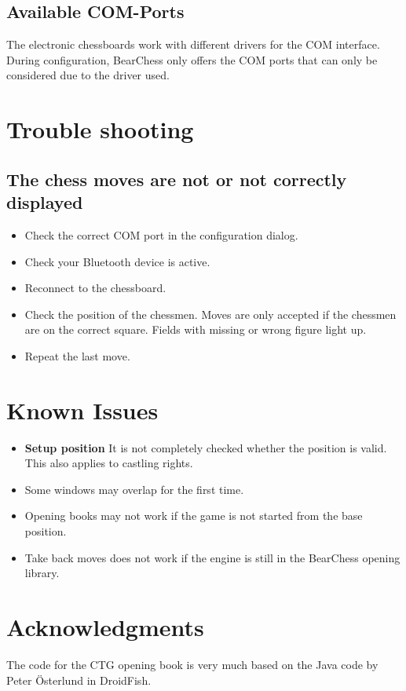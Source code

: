 \documentclass[11pt,a4paper]{article}
\begin{document}
\subsection{Available COM-Ports}
The electronic chessboards work with different drivers for the COM interface. During configuration, BearChess only offers the COM ports that can only be considered due to the driver used.

\section{Trouble shooting}

\subsection{The chess moves are not or not correctly displayed}
\begin{itemize}
	\item Check the correct COM port in the configuration dialog.
	\item Check your Bluetooth device is active.	
	\item Reconnect to the chessboard.	
	\item Check the position of the chessmen. Moves are only accepted if the chessmen are on the correct square. Fields with missing or wrong figure light up.
	\item Repeat the last move.
\end{itemize}


\section{Known Issues}
\begin{itemize}
    \item \textbf{Setup position} It is not completely checked whether the position is valid. This also applies to castling rights.
	\item Some windows may overlap for the first time.	
	\item Opening books may not work if the game is not started from the base position.	
	\item Take back moves does not work if the engine is still in the BearChess opening library.
\end{itemize}

\section{Acknowledgments}
The code for the CTG opening book is very much based on the Java code by Peter Österlund in DroidFish.
\end{document}
